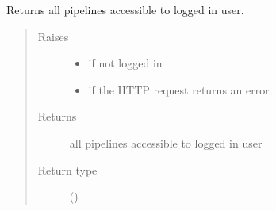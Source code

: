 \documentclass[letterpaper,10pt,english]{sphinxmanual}
\begin{document}
\begin{fulllineitems}
\begin{fulllineitems}
\begin{quote}
\begin{description}
\end{description}\end{quote}

\end{fulllineitems}


\begin{fulllineitems}
\label{\detokenize{autoapi/pine/client/index:pine.client.PineClient.get_pipelines}}
\sphinxAtStartPar
Returns all pipelines accessible to logged in user.
\begin{quote}\begin{description}
\item[{Raises}] \leavevmode\begin{itemize}
\item {} 
\sphinxAtStartPar
{\hyperref[\detokenize{autoapi/pine/client/exceptions/index:pine.client.exceptions.PineClientAuthException}]{}} \textendash{} if not logged in

\item {} 
\sphinxAtStartPar
{\hyperref[\detokenize{autoapi/pine/client/exceptions/index:pine.client.exceptions.PineClientHttpException}]{}} \textendash{} if the HTTP request returns an error

\end{itemize}

\item[{Returns}] \leavevmode
\sphinxAtStartPar
all pipelines accessible to logged in user

\item[{Return type}] \leavevmode
\sphinxAtStartPar
{}()

\end{description}\end{quote}

\end{fulllineitems}


\end{fulllineitems}
\end{document}
